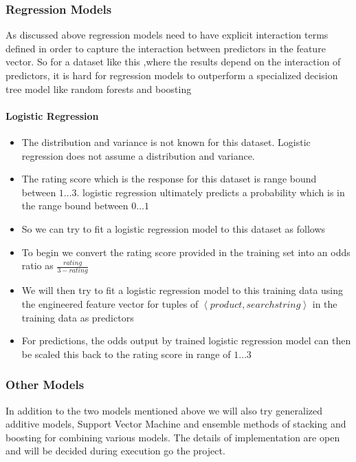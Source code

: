 \documentclass[twoside,12pt]{article}
\newcommand{\tuple}[1]{\ensuremath{\left \langle #1 \right \rangle }}
\begin{document}
\subsubsection{Regression Models}
As discussed above regression models need to have explicit interaction terms defined in order to capture the interaction between predictors in the feature vector. So for a dataset like this ,where the results depend on the interaction of predictors, it is hard for regression models to outperform a specialized decision tree model like random forests and boosting

\paragraph{Logistic Regression}
\begin{itemize}
\item
The distribution and variance is not known for this dataset. Logistic regression does not assume a distribution and variance.
\item
The rating score which is the response for this dataset is range bound between $1\dots 3$. logistic regression ultimately predicts a probability which is in the range bound between $0\dots 1$
\item
So we can try to fit a logistic regression model to this dataset as follows
\item
To begin we convert the rating score provided in the training set into an odds ratio as $\frac{rating}{3-rating}$
\item
We will then try to fit a logistic regression model to this training data using the engineered feature vector for tuples of \tuple{product,searchstring} in the training data as predictors
\item
For predictions, the odds output by trained logistic regression model can then be scaled this back to the rating score in range of $1\dots 3$ 
\end{itemize}

\subsubsection{Other Models}
In addition to the two models mentioned above we will also try generalized additive models, Support Vector Machine and ensemble methods of stacking and boosting for combining various models. The details of implementation are open and will be decided during execution go the project.

\FloatBarrier
\end{document}
